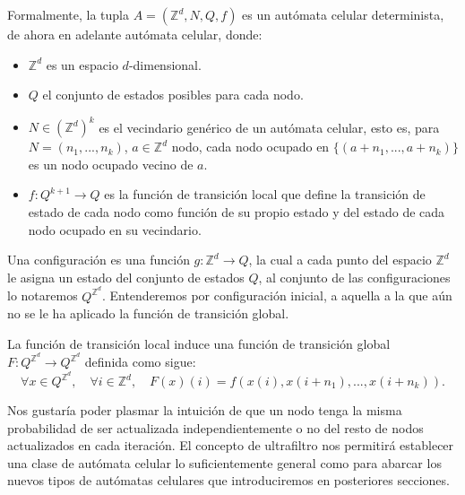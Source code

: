 \documentclass[../proyecto.tex]{memoir}
\begin{document}
\begin{defi}
Formalmente, la tupla $A=(\mathds{Z}^{d}, N, Q, f)$ es un autómata celular determinista, de ahora en adelante autómata celular, donde:

\begin{itemize}
\item $\mathds{Z} ^{d}$ es un espacio $d$-dimensional.
\item $Q$ el conjunto de estados posibles para cada nodo.
\item $N \in (\mathds{Z}^{d})^{k}$ es el vecindario genérico de un autómata celular, esto es, para $N=(n_{1},...,n_{k})$, $a \in \mathds{Z} ^{d}$ nodo, cada nodo ocupado en $\{(a+n_{1},...,a+n_{k})\}$ es un nodo ocupado vecino de $a$.
\item $f:Q^{k+1} \rightarrow Q$ es la función de transición local que define la transición de estado de cada nodo como función de su propio estado y del estado de cada nodo ocupado en su vecindario. 
\end{itemize}

\end{defi}

\begin{defi}
Una configuración es una función $g: \mathds{Z}^{d} \rightarrow Q$, la cual a cada punto del espacio $\mathds{Z}^{d}$ le asigna un estado del conjunto de estados $Q$, al conjunto de las configuraciones lo notaremos $Q^{\mathds{Z}^{d}}$. Entenderemos por configuración inicial, a aquella a la que aún no se le ha aplicado la función de transición global.
\end{defi}

\begin{defi}
La función de transición local induce una función de transición global $F:Q^{\mathds{Z}^{d}} \rightarrow Q^{\mathds{Z}^{d}}$ definida como sigue:
$$
\forall x \in Q^{\mathds{Z}^{d}}, \quad \forall i \in \mathds{Z}^{d}, \quad F(x)(i) = f(x(i),x(i+n_{1}),...,x(i+n_{k})).
$$
\end{defi}

Nos gustaría poder plasmar la intuición de que un nodo tenga la misma probabilidad de ser actualizada independientemente o no del resto de nodos actualizados en cada iteración. El concepto de ultrafiltro nos permitirá establecer una clase de autómata celular lo suficientemente general como para abarcar los nuevos tipos de autómatas celulares que introduciremos en posteriores secciones. 
\end{document}
